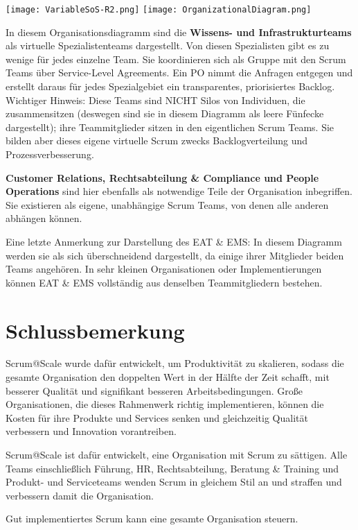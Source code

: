 \documentclass[12pt,a4paper,parskip=full]{scrartcl}
\begin{document}
\texttt{[image: VariableSoS-R2.png]}
\texttt{[image: OrganizationalDiagram.png]}

In diesem Organisationsdiagramm sind die \textbf{Wissens- und Infrastrukturteams}
als virtuelle Spezialistenteams dargestellt. Von diesen Spezialisten gibt es zu
wenige für jedes einzelne Team. Sie koordinieren sich als Gruppe mit den Scrum
Teams über Service-Level Agreements. Ein PO nimmt die Anfragen entgegen und
erstellt daraus für jedes Spezialgebiet ein transparentes, priorisiertes Backlog.
Wichtiger Hinweis: Diese Teams sind NICHT Silos von Individuen, die
zusammensitzen (deswegen sind sie in diesem Diagramm als leere Fünfecke
dargestellt); ihre Teammitglieder sitzen in den eigentlichen Scrum Teams.
Sie bilden aber dieses eigene virtuelle Scrum zwecks Backlogverteilung und
Prozessverbesserung.

\textbf{Customer Relations, Rechtsabteilung & Compliance und People Operations}
sind hier ebenfalls als notwendige Teile der Organisation inbegriffen. Sie
existieren als eigene, unabhängige Scrum Teams, von denen alle anderen abhängen
können.

Eine letzte Anmerkung zur Darstellung des EAT \& EMS: In diesem Diagramm werden
sie als sich überschneidend dargestellt, da einige ihrer Mitglieder beiden
Teams angehören. In sehr kleinen Organisationen oder Implementierungen können
EAT \& EMS vollständig aus denselben Teammitgliedern bestehen.

\section{Schlussbemerkung}
Scrum@Scale wurde dafür entwickelt, um Produktivität zu skalieren, sodass die
gesamte Organisation den doppelten Wert in der Hälfte der Zeit schafft, mit
besserer Qualität und signifikant besseren Arbeitsbedingungen. Große
Organisationen, die dieses Rahmenwerk richtig implementieren, können die Kosten
für ihre Produkte und Services senken und gleichzeitig Qualität verbessern und
Innovation vorantreiben.

Scrum@Scale ist dafür entwickelt, eine Organisation mit Scrum zu sättigen. Alle Teams
einschließlich Führung, HR, Rechtsabteilung, Beratung \& Training und Produkt-
und Serviceteams wenden Scrum in gleichem Stil an und straffen und verbessern damit die Organisation.

Gut implementiertes Scrum kann eine gesamte Organisation steuern.
\end{document}
